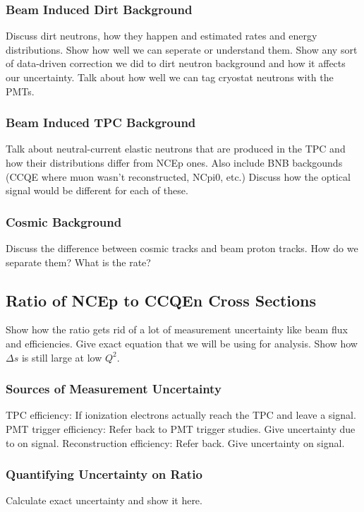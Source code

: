   \subsubsection{Beam Induced Dirt Background}
    Discuss dirt neutrons, how they happen and estimated rates and energy
    distributions.  Show how well we can seperate or understand them. Show any
    sort of data-driven correction we did to dirt neutron background and how it
    affects our uncertainty. Talk about how well we can tag cryostat neutrons
    with the PMTs.
  \subsubsection{Beam Induced TPC Background}
    Talk about neutral-current elastic neutrons that are produced in the TPC
    and how their distributions differ from NCEp ones. Also include BNB
    backgounds (CCQE where muon wasn't reconstructed, NCpi0, etc.) Discuss how
    the optical signal would be different for each of these.
  \subsubsection{Cosmic Background}
    Discuss the difference between cosmic tracks and beam proton tracks. How do
    we separate them? What is the rate?

\subsection{Ratio of NCEp to CCQEn Cross Sections}\label{ratios}
  Show how the ratio gets rid of a lot of measurement uncertainty like beam
  flux and efficiencies. Give exact equation that we will be using for
  analysis. Show how $\Delta s$ is still large at low $Q^2$.
  \subsubsection{Sources of Measurement Uncertainty}
    TPC efficiency: If ionization electrons actually reach the
    TPC and leave a signal.
    PMT trigger efficiency: Refer back to PMT trigger studies. Give uncertainty due to on signal.
    Reconstruction efficiency: Refer back. Give uncertainty on signal.
  \subsubsection{Quantifying Uncertainty on Ratio}\label{errorcalc}
    Calculate exact uncertainty and show it here.
